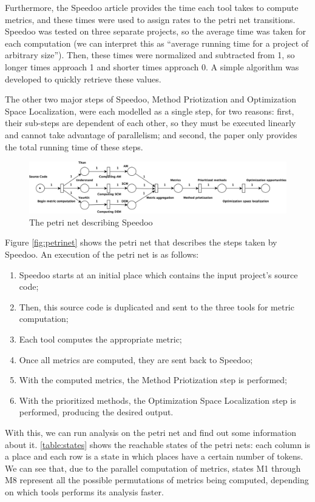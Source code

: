 \documentclass[11pt]{article}
\begin{document}
Furthermore, the Speedoo article provides the time each tool takes to compute metrics, and these times were used to assign rates to the petri net transitions.
Speedoo was tested on three separate projects, so the average time was taken for each computation (we can interpret this as ``average running time for a project of arbitrary size'').
Then, these times were normalized and subtracted from 1, so longer times approach 1 and shorter times approach 0.
A simple algorithm was developed to quickly retrieve these values.

The other two major steps of Speedoo, Method Priotization and Optimization Space Localization, were each modelled as a single step, for two reasons:
first, their sub-steps are dependent of each other, so they must be executed linearly and cannot take advantage of parallelism;
and second, the paper only provides the total running time of these steps.

\begin{figure}[!htbp]
\centering
\includegraphics[scale=0.4]{speedoo_petrinet.png}
\caption{The petri net describing Speedoo}
\label{fig:petrinet}
\end{figure}

Figure \autoref{fig:petrinet} shows the petri net that describes the steps taken by Speedoo.
An execution of the petri net is as follows:
\begin{enumerate}
	\item Speedoo starts at an initial place which contains the input project's source code;
	\item Then, this source code is duplicated and sent to the three tools for metric computation;
	\item Each tool computes the appropriate metric;
	\item Once all metrics are computed, they are sent back to Speedoo;
	\item With the computed metrics, the Method Priotization step is performed;
	\item With the prioritized methods, the Optimization Space Localization step is performed, producing the desired output.
\end{enumerate}

With this, we can run analysis on the petri net and find out some information about it.
\autoref{table:states} shows the reachable states of the petri nets: each column is a place and each row is a state in which places have a certain number of tokens.
We can see that, due to the parallel computation of metrics, states M1 through M8 represent all the possible permutations of metrics being computed, depending on which tools performs its analysis faster.
\end{document}
